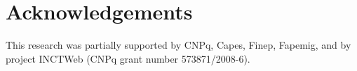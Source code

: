 \documentclass{vldb}
\begin{document}









\balance

\section{Acknowledgements}

This research was partially supported by CNPq, Capes, Finep, Fapemig, and by project INCTWeb (CNPq grant number 573871/2008-6).




\end{document}
